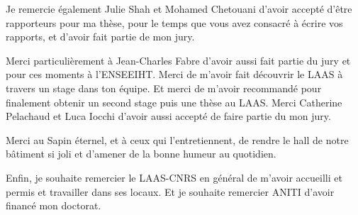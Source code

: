 
Je remercie également Julie Shah et Mohamed Chetouani d'avoir accepté d'être rapporteurs pour ma thèse, pour le temps que vous avez consacré à écrire vos rapports, et d'avoir fait partie de mon jury. 

Merci particulièrement à Jean-Charles Fabre d'avoir aussi fait partie du jury et pour ces moments à l'ENSEEIHT. Merci de m'avoir fait découvrir le LAAS à travers un stage dans ton équipe. Et merci de m'avoir recommandé pour finalement obtenir un second stage puis une thèse au LAAS.
Merci Catherine Pelachaud et Luca Iocchi d'avoir aussi accepté de faire partie du mon jury. 



Merci au Sapin éternel, et à ceux qui l'entretiennent, de rendre le hall de notre bâtiment si joli et d'amener de la bonne humeur au quotidien.



Enfin, je souhaite remercier le LAAS-CNRS en général de m'avoir accueilli et permis et travailler dans ses locaux. Et je souhaite remercier ANITI d'avoir financé mon doctorat.
